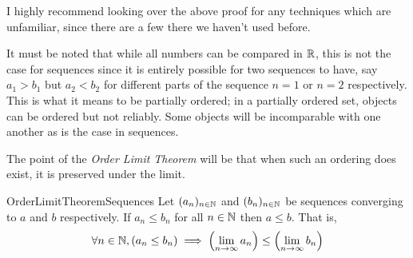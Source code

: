 \documentclass[11pt]{article}
\begin{document}
I highly recommend looking over the above proof for any techniques which are unfamiliar, since there are a few there we haven't used before.

It must be noted that while all numbers can be compared in $\mathbb{R}$, this is not the case for sequences since it is entirely possible for two sequences to have, say $a_1 > b_1$ but $a_2 < b_2$ for different parts of the sequence $n=1$ or $n=2$ respectively. This is what it means to be partially ordered; in a partially ordered set, objects can be ordered but not reliably. Some objects will be incomparable with one another as is the case in sequences.

The point of the \emph{Order Limit Theorem} will be that when such an ordering does exist, it is preserved under the limit.

\begin{label theorem}{OrderLimitTheoremSequences}
Let $(a_n)_{n\in \mathbb{N}}$ and $(b_n)_{n\in \mathbb{N}}$ be sequences converging to $a$ and $b$ respectively. If $a_n \le b_n$ for all $n\in \mathbb{N}$ then $a \le b$. That is, \begin{gather*}
\forall n\in \mathbb{N}, (a_n \le b_n) \implies \left( \lim_{n\to \infty} a_n \right) \le \left(\lim_{n\to\infty} b_n\right)
\end{gather*}
\end{label theorem}
\end{document}

